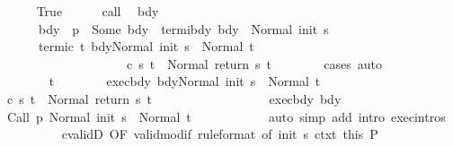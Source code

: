 \begin{isabellebody}
\ \ \ \ \isamarkupfalse%
\ True\isanewline
\ \ \ \ \isamarkupfalse%
\ call\ \isamarkupfalse%
\ bdy\ \ \isanewline
\ \ \ \ \ \ bdy{\isacharcolon}\ {\isachardoublequoteopen}{\isasymGamma}\ p\ {\isacharequal}\ Some\ bdy{\isachardoublequoteclose}\ \ termi{\isacharunderscore}bdy{\isacharcolon}\ {\isachardoublequoteopen}{\isasymGamma}{\isasymturnstile}bdy\ {\isasymdown}\ Normal\ {\isacharparenleft}init\ s{\isacharparenright}{\isachardoublequoteclose}\ \ \isanewline
\ \ \ \ \ \ termi{\isacharunderscore}c{\isacharcolon}\ {\isachardoublequoteopen}{\isasymforall}t{\isachardot}\ {\isasymGamma}{\isasymturnstile}{\isasymlangle}bdy{\isacharcomma}Normal\ {\isacharparenleft}init\ s{\isacharparenright}{\isasymrangle}\ {\isasymRightarrow}\ Normal\ t\ {\isasymlongrightarrow}\ \isanewline
\ \ \ \ \ \ \ \ \ \ \ \ \ \ \ \ \ \ \ \ {\isasymGamma}{\isasymturnstile}c\ s\ t\ {\isasymdown}\ Normal\ {\isacharparenleft}return{\isacharprime}\ s\ t{\isacharparenright}{\isachardoublequoteclose}\isanewline
\ \ \ \ \ \ \isamarkupfalse%
\ cases\ auto\ \isanewline
\ \ \ \ \isacommand{{\isacharbraceleft}}\isamarkupfalse%
\isanewline
\ \ \ \ \ \ \isamarkupfalse%
\ t\isanewline
\ \ \ \ \ \ \isamarkupfalse%
\ exec{\isacharunderscore}bdy{\isacharcolon}\ {\isachardoublequoteopen}{\isasymGamma}{\isasymturnstile}{\isasymlangle}bdy{\isacharcomma}Normal\ {\isacharparenleft}init\ s{\isacharparenright}{\isasymrangle}\ {\isasymRightarrow}\ Normal\ t{\isachardoublequoteclose}\isanewline
\ \ \ \ \ \ \isamarkupfalse%
\ {\isachardoublequoteopen}{\isasymGamma}{\isasymturnstile}c\ s\ t\ {\isasymdown}\ Normal\ {\isacharparenleft}return\ s\ t{\isacharparenright}{\isachardoublequoteclose}\isanewline
\ \ \ \ \ \ \isamarkupfalse%
\ {\isacharminus}\isanewline
\ \ \ \ \ \ \ \ \isamarkupfalse%
\ exec{\isacharunderscore}bdy\ bdy\isanewline
\ \ \ \ \ \ \ \ \isamarkupfalse%
\ {\isachardoublequoteopen}{\isasymGamma}{\isasymturnstile}{\isasymlangle}{\isacharparenleft}Call\ p\ {\isacharparenright}{\isacharcomma}Normal\ {\isacharparenleft}init\ s{\isacharparenright}{\isasymrangle}\ {\isasymRightarrow}\ Normal\ t{\isachardoublequoteclose}\isanewline
\ \ \ \ \ \ \ \ \ \ \isamarkupfalse%
\ {\isacharparenleft}auto\ simp\ add{\isacharcolon}\ intro{\isacharcolon}\ exec{\isachardot}intros{\isacharparenright}\isanewline
\ \ \ \ \ \ \ \ \isamarkupfalse%
\ cvalidD\ {\isacharbrackleft}OF\ valid{\isacharunderscore}modif\ {\isacharbrackleft}rule{\isacharunderscore}format{\isacharcomma}\ of\ {\isachardoublequoteopen}init\ s{\isachardoublequoteclose}{\isacharbrackright}\ ctxt{\isacharprime}\ this{\isacharbrackright}\ P\ \isanewline

\end{isabellebody}
